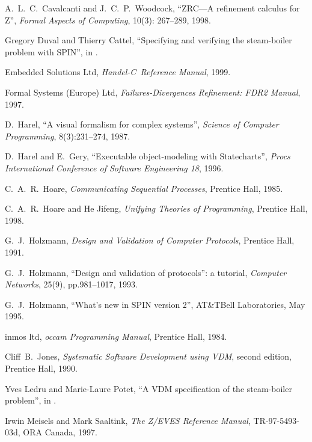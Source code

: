 \documentclass{report}
\newcommand{\HandelC}{\textsf{\slshape Handel-C}}
\begin{document}
\begin{thebibliography}{XX}
 A.~L.~C.~Cavalcanti and
  J.~C.~P.~Woodcock, ``ZRC---A refinement calculus for Z'',
  \textsl{Formal Aspects of Computing}, 10(3): 267--289, 1998.

 Gregory Duval and Thierry Cattel,
  ``Specifying and verifying the steam-boiler problem with SPIN'', in
  \cite[pp.203--217]{abrial-borger-langmaack-96}.

 Embedded Solutions Ltd,
  \emph{\HandelC\ Reference Manual}, 1999.

 Formal Systems (Europe) Ltd,
  \emph{Failures-Divergences Refinement: FDR2 Manual}, 1997.

 D.~Harel, ``A visual formalism for complex
  systems'', \emph{Science of Computer Programming}, 8(3):231--274,
  1987.

 D.~Harel and E.~Gery, ``Executable
  object-modeling with Statecharts'', \emph{Procs International
  Conference of Software Engineering 18}, 1996.

 C.~A.~R.~Hoare, \emph{Communicating Sequential
    Processes}, Prentice Hall, 1985.

 C.~A.~R.~Hoare and He Jifeng, \emph{Unifying
    Theories of Programming}, Prentice Hall, 1998.

 G.~J.~Holzmann, \emph{Design and Validation of
    Computer Protocols}, Prentice Hall, 1991.

 G.~J.~Holzmann, ``Design and validation of
  protocols'': a tutorial, \emph{Computer Networks}, 25(9),
  pp.981--1017, 1993.

 G.~J.~Holzmann, ``What's new in SPIN version
  2'', AT\&TBell Laboratories, May 1995.

 \textsf{inmos ltd}, \emph{\textsf{occam}
    Programming Manual}, Prentice Hall, 1984.

 Cliff~B.~Jones, \emph{Systematic Software
    Development using VDM}, second edition, Prentice Hall, 1990.

 Yves Ledru and Marie-Laure Potet, ``A VDM
  specification of the steam-boiler problem'', in
  \cite[pp.283--317]{abrial-borger-langmaack-96}.

 Irwin Meisels and Mark Saaltink,
  \emph{The Z/EVES Reference Manual}, TR-97-5493-03d, ORA Canada,
  1997.


\end{thebibliography}
\end{document}
